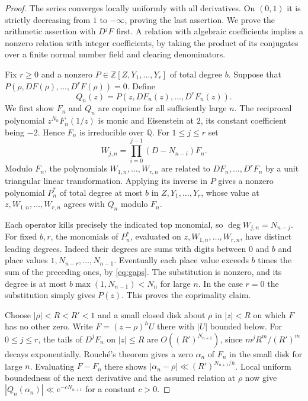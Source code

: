 \documentclass[11pt,a4paper]{article}
\theoremstyle{definition}
\theoremstyle{remark}
\newcommand{\Q}{\mathbb Q}
\newcommand{\Z}{\mathbb Z}
\numberwithin{equation}{section}
\begin{document}
\begin{proof}
The series converges locally uniformly with all derivatives. On $(0,1)$ it is strictly decreasing from $1$ to $-\infty$, proving the last assertion. We prove the arithmetic assertion with $D^jF$ first. A relation with algebraic coefficients implies a nonzero relation with integer coefficients, by taking the product of its conjugates over a finite normal number field and clearing denominators.

Fix $r\ge0$ and a nonzero $P\in\Z[Z,Y_1,\ldots,Y_r]$ of total degree $b$. Suppose that $P(\rho,DF(\rho),\ldots,D^rF(\rho))=0$. Define
\[
 Q_n(z)=P(z,DF_n(z),\ldots,D^rF_n(z)).
\]
We first show $F_n$ and $Q_n$ are coprime for all sufficiently large $n$. The reciprocal polynomial $z^{N_n}F_n(1/z)$ is monic and Eisenstein at $2$, its constant coefficient being $-2$. Hence $F_n$ is irreducible over $\Q$. For $1\le j\le r$ set
\[
 W_{j,n}=\prod_{i=0}^{j-1}(D-N_{n-i})F_n .
\]
Modulo $F_n$, the polynomials $W_{1,n},\ldots,W_{r,n}$ are related to $DF_n,\ldots,D^rF_n$ by a unit triangular linear transformation. Applying its inverse in $P$ gives a nonzero polynomial $P_n^*$ of total degree at most $b$ in $Z,Y_1,\ldots,Y_r$, whose value at $z,W_{1,n},\ldots,W_{r,n}$ agrees with $Q_n$ modulo $F_n$.

Each operator kills precisely the indicated top monomial, so $\deg W_{j,n}=N_{n-j}$. For fixed $b,r$, the monomials of $P_n^*$, evaluated on $z,W_{1,n},\ldots,W_{r,n}$, have distinct leading degrees. Indeed their degrees are sums with digits between $0$ and $b$ and place values $1,N_{n-r},\ldots,N_{n-1}$. Eventually each place value exceeds $b$ times the sum of the preceding ones, by \eqref{eq:gaps}. The substitution is nonzero, and its degree is at most $b\max(1,N_{n-1})<N_n$ for large $n$. In the case $r=0$ the substitution simply gives $P(z)$. This proves the coprimality claim.

Choose $|\rho|<R<R'<1$ and a small closed disk about $\rho$ in $|z|<R$ on which $F$ has no other zero. Write $F=(z-\rho)^h U$ there with $|U|$ bounded below. For $0\le j\le r$, the tails of $D^jF_n$ on $|z|\le R$ are $O((R')^{N_{n+1}})$, since $m^j R^m/(R')^m$ decays exponentially. Rouch\'e's theorem gives a zero $\alpha_n$ of $F_n$ in the small disk for large $n$. Evaluating $F-F_n$ there shows $|\alpha_n-\rho|\ll(R')^{N_{n+1}/h}$. Local uniform boundedness of the next derivative and the assumed relation at $\rho$ now give $|Q_n(\alpha_n)|\ll e^{-c N_{n+1}}$ for a constant $c>0$.


\end{proof}
\end{document}
